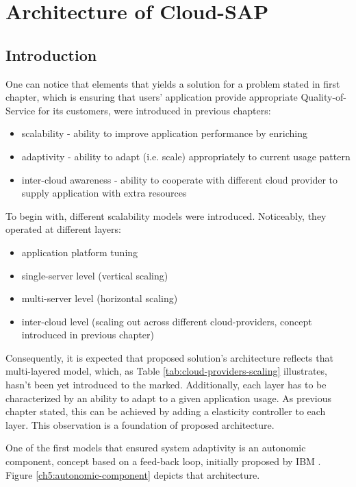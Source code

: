 \chapter{Architecture of Cloud-SAP}


\section{Introduction}

One can notice that elements that yields a solution for a problem stated in first chapter, which is ensuring that users' application provide appropriate Quality-of-Service for its customers, were introduced in previous chapters:
\begin{itemize}
	\item scalability - ability to improve application performance by enriching 
	\item adaptivity - ability to adapt (i.e. scale) appropriately to current usage pattern
	\item inter-cloud awareness - ability to cooperate with different cloud provider to supply application with extra resources
\end{itemize}

To begin with, different scalability models were introduced. Noticeably, they operated at different layers: 
\begin{itemize}
	\item application platform tuning
	\item single-server level (vertical scaling)
	\item multi-server level (horizontal scaling) 
	\item inter-cloud level (scaling out across different cloud-providers, concept introduced in previous chapter)
\end{itemize}
Consequently, it is expected that proposed solution's architecture reflects that multi-layered model, which, as Table \ref{tab:cloud-providers-scaling} illustrates, hasn't been yet introduced to the marked. Additionally, each layer has to be characterized by an ability to adapt to a given application usage. As previous chapter stated, this can be achieved by adding a elasticity controller to each layer. This observation is a foundation of proposed architecture.

One of the first models that ensured system adaptivity is an autonomic component, concept based on a feed-back loop, initially proposed by IBM \cite{IBM06}. Figure \ref{ch5:autonomic-component} depicts that architecture. 

